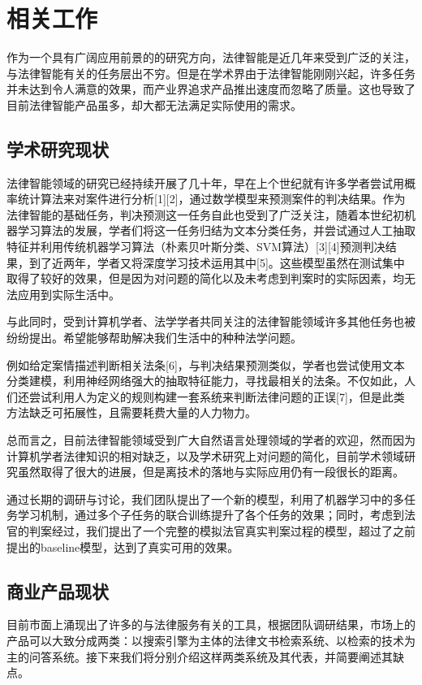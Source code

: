 \chapter{相关工作}
\label{cha:related}

作为一个具有广阔应用前景的的研究方向，法律智能是近几年来受到广泛的关注，与法律智能有关的任务层出不穷。但是在学术界由于法律智能刚刚兴起，许多任务并未达到令人满意的效果，而产业界追求产品推出速度而忽略了质量。这也导致了目前法律智能产品虽多，却大都无法满足实际使用的需求。


\section{学术研究现状}
法律智能领域的研究已经持续开展了几十年，早在上个世纪就有许多学者尝试用概率统计算法来对案件进行分析[1][2]，通过数学模型来预测案件的判决结果。作为法律智能的基础任务，判决预测这一任务自此也受到了广泛关注，随着本世纪初机器学习算法的发展，学者们将这一任务归结为文本分类任务，并尝试通过人工抽取特征并利用传统机器学习算法（朴素贝叶斯分类、SVM算法）[3][4]预测判决结果，到了近两年，学者又将深度学习技术运用其中[5]。这些模型虽然在测试集中取得了较好的效果，但是因为对问题的简化以及未考虑到判案时的实际因素，均无法应用到实际生活中。

与此同时，受到计算机学者、法学学者共同关注的法律智能领域许多其他任务也被纷纷提出。希望能够帮助解决我们生活中的种种法学问题。

例如给定案情描述判断相关法条[6]，与判决结果预测类似，学者也尝试使用文本分类建模，利用神经网络强大的抽取特征能力，寻找最相关的法条。不仅如此，人们还尝试利用人为定义的规则构建一套系统来判断法律问题的正误[7]，但是此类方法缺乏可拓展性，且需要耗费大量的人力物力。

总而言之，目前法律智能领域受到广大自然语言处理领域的学者的欢迎，然而因为计算机学者法律知识的相对缺乏，以及学术研究上对问题的简化，目前学术领域研究虽然取得了很大的进展，但是离技术的落地与实际应用仍有一段很长的距离。

通过长期的调研与讨论，我们团队提出了一个新的模型，利用了机器学习中的多任务学习机制，通过多个子任务的联合训练提升了各个任务的效果；同时，考虑到法官的判案经过，我们提出了一个完整的模拟法官真实判案过程的模型，超过了之前提出的baseline模型，达到了真实可用的效果。


\section{商业产品现状}
目前市面上涌现出了许多的与法律服务有关的工具，根据团队调研结果，市场上的产品可以大致分成两类：以搜索引擎为主体的法律文书检索系统、以检索的技术为主的问答系统。接下来我们将分别介绍这样两类系统及其代表，并简要阐述其缺点。

